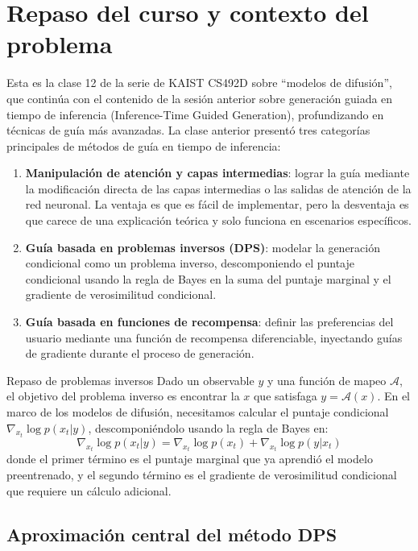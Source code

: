 \section{Repaso del curso y contexto del problema}

Esta es la clase 12 de la serie de KAIST CS492D sobre ``modelos de difusión'', que continúa con el contenido de la sesión anterior sobre generación guiada en tiempo de inferencia (Inference-Time Guided Generation), profundizando en técnicas de guía más avanzadas. La clase anterior presentó tres categorías principales de métodos de guía en tiempo de inferencia:

\begin{enumerate}
    \item \textbf{Manipulación de atención y capas intermedias}: lograr la guía mediante la modificación directa de las capas intermedias o las salidas de atención de la red neuronal. La ventaja es que es fácil de implementar, pero la desventaja es que carece de una explicación teórica y solo funciona en escenarios específicos.
    \item \textbf{Guía basada en problemas inversos (DPS)}: modelar la generación condicional como un problema inverso, descomponiendo el puntaje condicional usando la regla de Bayes en la suma del puntaje marginal y el gradiente de verosimilitud condicional.
    \item \textbf{Guía basada en funciones de recompensa}: definir las preferencias del usuario mediante una función de recompensa diferenciable, inyectando guías de gradiente durante el proceso de generación.
\end{enumerate}

\begin{importantbox}{Repaso de problemas inversos}
Dado un observable $y$ y una función de mapeo $\mathcal{A}$, el objetivo del problema inverso es encontrar la $x$ que satisfaga $y = \mathcal{A}(x)$. En el marco de los modelos de difusión, necesitamos calcular el puntaje condicional $\nabla_{x_t} \log p(x_t | y)$, descomponiéndolo usando la regla de Bayes en:
$$\nabla_{x_t} \log p(x_t | y) = \nabla_{x_t} \log p(x_t) + \nabla_{x_t} \log p(y | x_t)$$
donde el primer término es el puntaje marginal que ya aprendió el modelo preentrenado, y el segundo término es el gradiente de verosimilitud condicional que requiere un cálculo adicional.
\end{importantbox}

\subsection{Aproximación central del método DPS}

